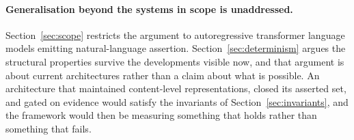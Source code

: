 \paragraph{Generalisation beyond the systems in scope is unaddressed.}
Section~\ref{sec:scope} restricts the argument to autoregressive transformer language
models emitting natural-language assertion. Section~\ref{sec:determinism} argues the
structural properties survive the developments visible now, and that argument is about
current architectures rather than a claim about what is possible. An architecture that
maintained content-level representations, closed its asserted set, and gated on evidence
would satisfy the invariants of Section~\ref{sec:invariants}, and the framework would
then be measuring something that holds rather than something that fails.
